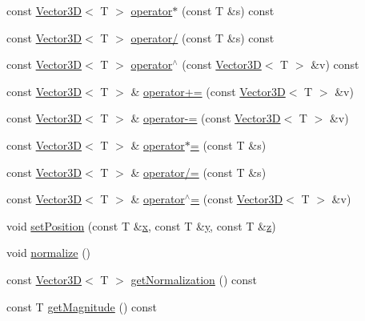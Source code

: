 \begin{DoxyCompactItemize}
\item 
const \hyperlink{class_piko_1_1_vector3_d}{Vector3\-D}$<$ T $>$ \hyperlink{class_piko_1_1_vector3_d_a20aa098ea0ed1ad2f804c4a58b426705}{operator$\ast$} (const T \&s) const 
\item 
const \hyperlink{class_piko_1_1_vector3_d}{Vector3\-D}$<$ T $>$ \hyperlink{class_piko_1_1_vector3_d_a38b2634da67030a7d2d15edde281f672}{operator/} (const T \&s) const 
\item 
const \hyperlink{class_piko_1_1_vector3_d}{Vector3\-D}$<$ T $>$ \hyperlink{class_piko_1_1_vector3_d_a7430488c64a8232e8196be0e278c54cd}{operator$^\wedge$} (const \hyperlink{class_piko_1_1_vector3_d}{Vector3\-D}$<$ T $>$ \&v) const 
\item 
const \hyperlink{class_piko_1_1_vector3_d}{Vector3\-D}$<$ T $>$ \& \hyperlink{class_piko_1_1_vector3_d_ab4c805da245bead0c54740e6816939f4}{operator+=} (const \hyperlink{class_piko_1_1_vector3_d}{Vector3\-D}$<$ T $>$ \&v)
\item 
const \hyperlink{class_piko_1_1_vector3_d}{Vector3\-D}$<$ T $>$ \& \hyperlink{class_piko_1_1_vector3_d_a03278b5fe8205662b1abb9462b049f31}{operator-\/=} (const \hyperlink{class_piko_1_1_vector3_d}{Vector3\-D}$<$ T $>$ \&v)
\item 
const \hyperlink{class_piko_1_1_vector3_d}{Vector3\-D}$<$ T $>$ \& \hyperlink{class_piko_1_1_vector3_d_a8265ee40607f4bf4778839bc12009f61}{operator$\ast$=} (const T \&s)
\item 
const \hyperlink{class_piko_1_1_vector3_d}{Vector3\-D}$<$ T $>$ \& \hyperlink{class_piko_1_1_vector3_d_a3fb27ccff6932d223fe7f9a6f11e0d3f}{operator/=} (const T \&s)
\item 
const \hyperlink{class_piko_1_1_vector3_d}{Vector3\-D}$<$ T $>$ \& \hyperlink{class_piko_1_1_vector3_d_a350dd75a31735f7d3257843520c3ed04}{operator$^\wedge$=} (const \hyperlink{class_piko_1_1_vector3_d}{Vector3\-D}$<$ T $>$ \&v)
\item 
void \hyperlink{class_piko_1_1_vector3_d_a7728d7804a932a8228651c2dc3d65e39}{set\-Position} (const T \&\hyperlink{class_piko_1_1_vector3_d_abb96dedfc12a40f512eb2e2dd661101f}{x}, const T \&\hyperlink{class_piko_1_1_vector3_d_a417b3ceda79a9e1b31973a9c4cb5c14a}{y}, const T \&\hyperlink{class_piko_1_1_vector3_d_a0562caf62dbc2ca47c740335b56be3a8}{z})
\item 
void \hyperlink{class_piko_1_1_vector3_d_a36142e3de61c375d18c705c0611a6862}{normalize} ()
\item 
const \hyperlink{class_piko_1_1_vector3_d}{Vector3\-D}$<$ T $>$ \hyperlink{class_piko_1_1_vector3_d_af9ecdcdb113f3156c2c23f4759beb84b}{get\-Normalization} () const 
\item 
const T \hyperlink{class_piko_1_1_vector3_d_ab62d589dbbabb26ee845594d8e954fe2}{get\-Magnitude} () const 
\end{DoxyCompactItemize}
